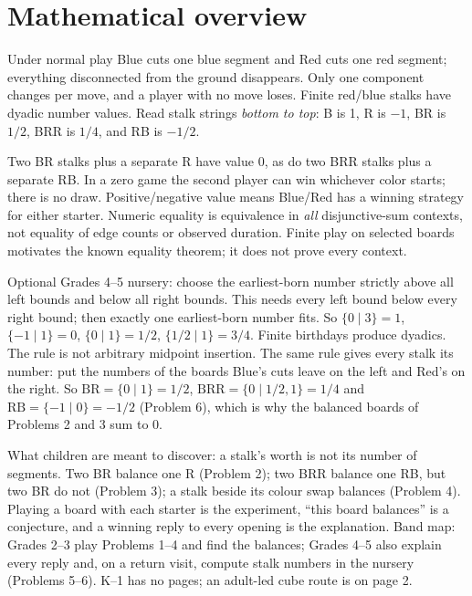 \documentclass[11pt,letterpaper]{article}
\begin{document}
\section*{Mathematical overview}
Under normal play Blue cuts one blue segment and Red cuts one red segment; everything disconnected from the ground disappears. Only one component changes per move, and a player with no move loses. Finite red/blue stalks have dyadic number values. Read stalk strings \emph{bottom to top}: B is 1, R is $-1$, BR is $1/2$, BRR is $1/4$, and RB is $-1/2$.

Two BR stalks plus a separate R have value 0, as do two BRR stalks plus a separate RB. In a zero game the second player can win whichever color starts; there is no draw. Positive/negative value means Blue/Red has a winning strategy for either starter. Numeric equality is equivalence in \emph{all} disjunctive-sum contexts, not equality of edge counts or observed duration. Finite play on selected boards motivates the known equality theorem; it does not prove every context.

Optional Grades 4--5 nursery: choose the earliest-born number strictly above all left bounds and below all right bounds. This needs every left bound below every right bound; then exactly one earliest-born number fits. So $\{0\mid3\}=1$, $\{-1\mid1\}=0$, $\{0\mid1\}=1/2$, $\{1/2\mid1\}=3/4$. Finite birthdays produce dyadics. The rule is not arbitrary midpoint insertion. The same rule gives every stalk its number: put the numbers of the boards Blue's cuts leave on the left and Red's on the right. So $\mathrm{BR}=\{0\mid1\}=1/2$, $\mathrm{BRR}=\{0\mid 1/2,1\}=1/4$ and $\mathrm{RB}=\{-1\mid0\}=-1/2$ (Problem 6), which is why the balanced boards of Problems 2 and 3 sum to 0.

What children are meant to discover: a stalk's worth is not its number of segments. Two BR balance one R (Problem 2); two BRR balance one RB, but two BR do not (Problem 3); a stalk beside its colour swap balances (Problem 4). Playing a board with each starter is the experiment, ``this board balances'' is a conjecture, and a winning reply to every opening is the explanation. Band map: Grades 2--3 play Problems 1--4 and find the balances; Grades 4--5 also explain every reply and, on a return visit, compute stalk numbers in the nursery (Problems 5--6). K--1 has no pages; an adult-led cube route is on page 2.
\newpage
\end{document}
